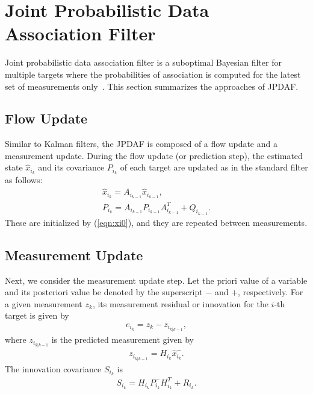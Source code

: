 \documentclass[letterpaper, 10pt, conference]{ieeeconf}
\newcommand{\refeqn}[1]{(\ref{eqn:#1})}
\begin{document}
		


\section{Joint Probabilistic Data Association Filter}
\label{JPDAF}

Joint probabilistic data association filter is a suboptimal Bayesian filter for multiple targets where the probabilities of association is computed for the latest set of measurements only~\cite{TrackDataAssoc}. This section summarizes the approaches of JPDAF. 

\subsection{Flow Update}
Similar to Kalman filters, the JPDAF is composed of a flow update and a measurement update. During the flow update (or prediction step), the estimated state $\hat x_{i_k}$ and its covariance $P_{i_k}$ of each target are updated as in the standard filter as follows:
\begin{gather}
\hat x_{i_{k}} = A_{i_{k-1}} \hat x_{i_{k-1}},\\
P_{i_{k}} = A_{i_{k-1}} P_{i_{k-1}} A_{i_{k-1}}^T + Q_{i_{k-1}}.
\end{gather}
These are initialized by \refeqn{xi0}, and they are repeated between measurements. 

\subsection{Measurement Update}

Next, we consider the measurement update step. Let  the priori value of a variable and its posteriori value be denoted by the superscript $-$ and $+$, respectively. For a given measurement $z_{k}$, its measurement residual or innovation for the $i$-th target is given by
\begin{align*}
e_{i_k} = z_k - z_{i_{k|k-1}},
\end{align*}
where $z_{i_{k|k-1}}$ is the predicted measurement given by
\begin{align}
z_{i_{k|k-1}} = H_{i_k} \hat x_{i_k}^-.
\end{align}
The innovation covariance $S_{i_k}$ is
\begin{align}
S_{i_k}=H_{i_k}P_{i_k}^{-}H_{i_k}^T+R_{i_k}.
\end{align}
\end{document}
